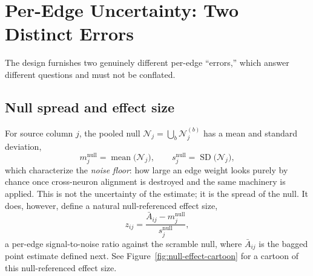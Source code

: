 \documentclass[11pt]{article}
\begin{document}
\section{Per-Edge Uncertainty: Two Distinct Errors}
\label{sec:errors}

The design furnishes two genuinely different per-edge ``errors,'' which
answer different questions and must not be conflated.

\subsection{Null spread and effect size}

For source column \(j\), the pooled null
\(\mathcal{N}_j=\bigcup_b\mathcal{N}^{(b)}_j\)
has a mean and standard deviation,
\[
m^{\text{null}}_j=\operatorname{mean}\big(\mathcal{N}_j\big),
\qquad
s^{\text{null}}_j=\operatorname{SD}\big(\mathcal{N}_j\big),
\]
which characterize the \emph{noise floor}: how large an edge weight looks
purely by chance once cross-neuron alignment is destroyed and the same
machinery is applied. This is not the uncertainty of the estimate; it is the
spread of the null. It does, however, define a natural null-referenced
effect size,
\[
z_{ij}=\frac{\bar A_{ij}-m^{\text{null}}_j}{s^{\text{null}}_j},
\]
a per-edge signal-to-noise ratio against the scramble null, where
\(\bar A_{ij}\) is the bagged point estimate defined next.
See Figure~\ref{fig:null-effect-cartoon} for a cartoon of this null-referenced
effect size.
\end{document}
